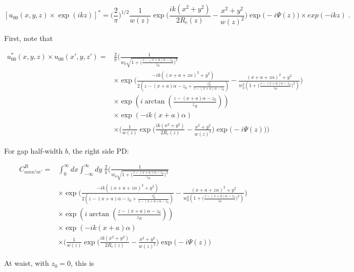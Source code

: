 \documentclass[aps,twoside,secnumarabic,balancelastpage,amsmath,amssymb,nofootinbib,hyperref=pdftex]{revtex4}
\newcommand{\bigfrac}[2]{\Big( \frac{#1}{#2}\Big)}
\begin{document}
\begin{equation*}
\left[u_{00}(x,y,z)\times \exp(ikz)\right] ^*= 
			\bigfrac{2}{\pi}^{1/2}
			\frac{1}{w(z)}
			\exp \Big(\frac{ik(x^{2}+y^{2})}{2R_{c}(z)}-
			\frac{x^{2}+y^{2}}{w(z)^{2}} \Big) 
			\exp \Big( -i\Psi(z) \Big) \times exp(-ikz)
			\; .
\end{equation*}

First, note that

\begin{align*}
	u_{00}^* (x,y,z) \times u_{00}(x',y,z') =&
		\frac{2}{\pi}
		\Big(
			\frac{1}{w_0 \sqrt{1+\bigfrac{z-(x+a)\alpha -z_0}{z_R}^2}}
			\\&
			\times
			\exp 
			\Big(
			\frac
			{
			-ik((x+a+z\alpha)^{2}		
			+y^{2})
			}
			{2( z-(x+a)\alpha  - z_0 + 
			\frac{z_R^2}{z-(x+a)\alpha -z_0 } ) }-
			\frac{(x+a+z\alpha)^{2}  +y^{2}}
			{
				w_0^2 (1+\bigfrac{z-(x+a)\alpha-z_0}{z_R}^2)
			}
			\Big)
			\\&
			\times \exp(
			i \arctan( \frac{z-(x+a)\alpha - z_0}{z_R}) )				
			\\&
			\times \exp(
			-ik(x+a)\alpha )	
		\\ &\times
		\Big(
			\frac{1}{w(z)}
			\exp \Big(\frac{ik(x^{2}+y^{2})}{2R_{c}(z)}-
			\frac{x^{2}+y^{2}}{w(z)^{2}} \Big) 
			\exp \Big( -i\Psi(z) \Big)
		\Big)
\end{align*}

For gap half-width $b$, the right side PD:

\begin{align*}
		C_{nmn'm'}^{R} =&
		\int_{0}^{\infty} dx\int_{-\infty}^{\infty}  dy \;
		\frac{2}{\pi}
		\Big(
			\frac{1}{w_0 \sqrt{1+\bigfrac{z-(x+a)\alpha -z_0}{z_R}^2}}
			\\&
			\times
			\exp 
			\Big(
			\frac
			{
			-ik((x+a+z\alpha)^{2}		
			+y^{2})
			}
			{2( z-(x+a)\alpha  - z_0 + 
			\frac{z_R^2}{z-(x+a)\alpha -z_0 } ) }-
			\frac{(x+a+z\alpha)^{2}  +y^{2}}
			{
				w_0^2 (1+\bigfrac{z-(x+a)\alpha-z_0}{z_R}^2)
			}
			\Big)
			\\&
			\times \exp(
			i \arctan( \frac{z-(x+a)\alpha - z_0}{z_R}) )				
			\\&
			\times \exp(
			-ik(x+a)\alpha )	
		\\ &\times
		\Big(
			\frac{1}{w(z)}
			\exp \Big(\frac{ik(x^{2}+y^{2})}{2R_{c}(z)}-
			\frac{x^{2}+y^{2}}{w(z)^{2}} \Big) 
			\exp \Big( -i\Psi(z) \Big)
\end{align*}

At waist, with $z_0=0$, this is
\end{document}
